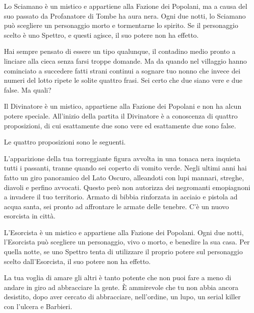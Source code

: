 {{{{{{{Lo Sciamano è un mistico e appartiene alla Fazione dei Popolani, ma a causa del suo passato da Profanatore di Tombe ha aura nera. Ogni due notti, lo Sciamano può scegliere un personaggio morto e tormentarne lo spirito. Se il personaggio scelto è uno Spettro, e questi agisce, il suo potere non ha effetto.
{%


{%
Hai sempre pensato di essere un tipo qualunque, il contadino medio pronto a linciare alla cieca senza farsi troppe domande. Ma da quando nel villaggio hanno cominciato a succedere fatti strani continui a sognare tuo nonno che invece dei numeri del lotto ripete le solite quattro frasi. Sei certo che due siano vere e due false. Ma quali?

Il Divinatore è un mistico, appartiene alla Fazione dei Popolani e non ha alcun potere speciale. All'inizio della partita il Divinatore è a conoscenza di quattro proposizioni, di cui esattamente due sono vere ed esattamente due sono false.

Le quattro proposizioni sono le seguenti.
{%


{%
L'apparizione della tua torreggiante figura avvolta in una tonaca nera inquieta tutti i passanti, tranne quando sei coperto di vomito verde. Negli ultimi anni hai fatto un giro panoramico del Lato Oscuro, alleandoti con lupi mannari, streghe, diavoli e perfino avvocati. Questo però non autorizza dei negromanti emopiagnoni a invadere il tuo territorio. Armato di bibbia rinforzata in acciaio e pistola ad acqua santa, sei pronto ad affrontare le armate delle tenebre. C'è un nuovo esorcista in città.

L'Esorcista è un mistico e appartiene alla Fazione dei Popolani. Ogni due notti, l'Esorcista può scegliere un personaggio, vivo o morto, e benedire la sua casa. Per quella notte, se uno Spettro tenta di utilizzare il proprio potere sul personaggio scelto dall'Esorcista, il suo potere non ha effetto.
{%


{%
La tua voglia di amare gli altri è tanto potente che non puoi fare a meno di andare in giro ad abbracciare la gente. È ammirevole che tu non abbia ancora desistito, dopo aver cercato di abbracciare, nell'ordine, un lupo, un serial killer con l'ulcera e Barbieri.

}}}}}}}}}}}}}
